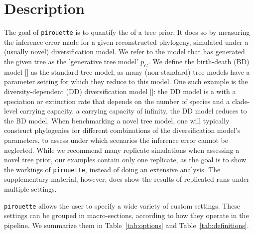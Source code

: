 \section{Description}

The goal of \verb;pirouette; is to quantify the  of a tree prior.
It does so by measuring the inference error made 
for a given reconstructed phylogeny, 
simulated under a (usually novel) diversification model.
We refer to the model that has generated the given tree
as the 'generative tree model' $\mathit{p_{G}}$.
We define the birth-death (BD) model [\cite{nee1994reconstructed}] as
the standard tree model, as many (non-standard) tree models 
have a parameter setting for which they reduce to this model. 
One such example is the diversity-dependent (DD) diversification 
model [\cite{DDD, etienne2012diversity}]:
the DD model is a  with a speciation or extinction rate that depends 
on the number of species and a clade-level carrying capacity.
 a carrying capacity
of infinity, the DD model reduces to the BD model.
When benchmarking a novel tree model, 
one will typically construct phylogenies 
for different combinations of the diversification model's parameters, 
to assess under which scenarios the inference error cannot be neglected. 
While we recommend many replicate simulations 
when assessing a novel tree prior, 
our examples contain only one replicate,
as the goal is to show the workings of \verb;pirouette;,
instead of doing an extensive analysis.
The supplementary material, however, does show the results
of replicated runs under multiple settings.

\verb;pirouette; allows the user to specify a wide variety of custom settings. 
These settings can be grouped in macro-sections, 
according to how they operate in the pipeline. 
We summarize them in Table~\ref{tab:options} and Table~\ref{tab:definitions}.

